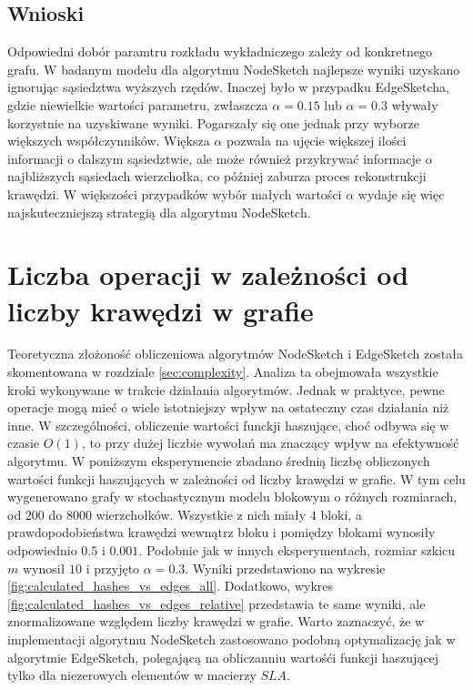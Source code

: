     \subsection{Wnioski}
    Odpowiedni dobór paramtru rozkładu wykładniczego zależy od konkretnego grafu. W badanym modelu dla algorytmu NodeSketch najlepsze wyniki uzyskano ignorując sąsiedztwa wyższych rzędów. Inaczej było w przypadku EdgeSketcha, gdzie niewielkie wartości parametru, zwłaszcza $\alpha = 0.15$ lub $\alpha = 0.3$ wływały korzystnie na uzyskiwane wyniki. Pogarszały się one jednak przy wyborze większych współczynników. Większa $\alpha$ pozwala na ujęcie większej ilości informacji o dalszym sąsiedztwie, ale może również przykrywać informacje o najbliższych sąsiedach wierzchołka, co później zaburza proces rekonstrukcji krawędzi. W większości przypadków wybór małych wartości $\alpha$ wydaje się więc najskuteczniejszą strategią dla algorytmu NodeSketch. 

\section{Liczba operacji w zależności od liczby krawędzi w grafie}
\label{sec:performance}

    Teoretyczna złożoność obliczeniowa algorytmów NodeSketch i EdgeSketch została skomentowana w rozdziale \ref{sec:complexity}. Analiza ta obejmowała wszystkie kroki wykonywane w trakcie działania algorytmów. Jednak w praktyce, pewne operacje mogą mieć o wiele istotniejszy wpływ na ostateczny czas działania niż inne. W szczególności, obliczenie wartości funckji haszujące, choć odbywa się w czasie $O(1)$, to przy dużej liczbie wywołań ma znaczący wpływ na efektywność algorytmu. W poniższym eksperymencie zbadano średnią liczbę obliczonych wartości funkcji haszujących w zależności od liczby krawędzi w grafie. W tym celu wygenerowano grafy w stochastycznym modelu blokowym o różnych rozmiarach, od $200$ do $8000$ wierzchołków. Wszystkie z nich miały $4$ bloki, a prawdopodobieństwa krawędzi wewnątrz bloku i pomiędzy blokami wynosiły odpowiednio $0.5$ i $0.001$. Podobnie jak w innych eksperymentach, rozmiar szkicu $m$ wynosił $10$ i przyjęto $\alpha = 0.3$. Wyniki przedstawiono na wykresie \ref{fig:calculated_hashes_vs_edges_all}. Dodatkowo, wykres \ref{fig:calculated_hashes_vs_edges_relative} przedstawia te same wyniki, ale znormalizowane względem liczby krawędzi w grafie. Warto zaznaczyć, że w implementacji algorytmu NodeSketch zastosowano podobną optymalizację jak w algorytmie EdgeSketch, polegającą na obliczanniu wartośći funkcji haszującej tylko dla niezerowych elementów w macierzy $SLA$. 

